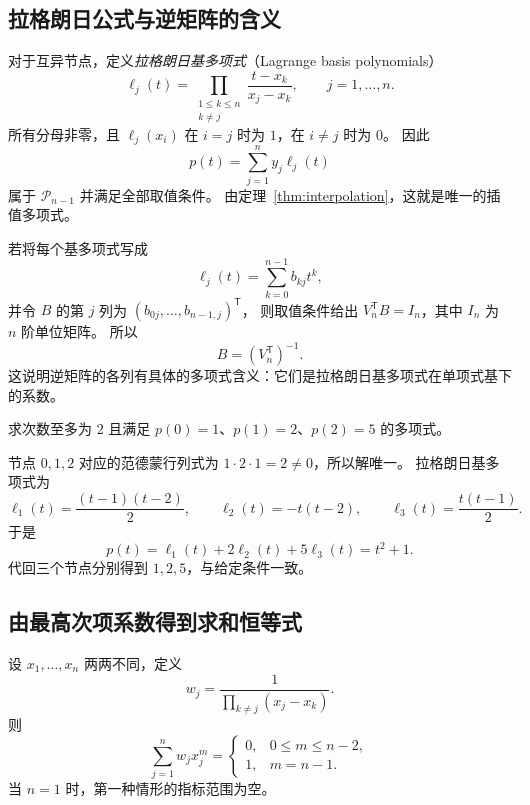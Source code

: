 \documentclass[UTF8,12pt,a4paper,fontset=fandol]{ctexart}
\begin{document}
\subsection{拉格朗日公式与逆矩阵的含义}

对于互异节点，定义\emph{拉格朗日基多项式}（Lagrange basis polynomials）
\begin{equation}
  \ell_j(t)=\prod_{\substack{1\leq k\leq n\\k\ne j}}
  \frac{t-x_k}{x_j-x_k},\qquad j=1,\ldots,n.
  \label{eq:lagrange-basis}
\end{equation}
所有分母非零，且 $\ell_j(x_i)$ 在 $i=j$ 时为 $1$，在 $i\ne j$ 时为 $0$。
因此
\begin{equation}
  p(t)=\sum_{j=1}^n y_j\ell_j(t)
  \label{eq:lagrange-interpolation}
\end{equation}
属于 $\mathcal P_{n-1}$ 并满足全部取值条件。
由定理~\ref{thm:interpolation}，这就是唯一的插值多项式。

若将每个基多项式写成
\[
  \ell_j(t)=\sum_{k=0}^{n-1}b_{kj}t^k,
\]
并令 $B$ 的第 $j$ 列为 $(b_{0j},\ldots,b_{n-1,j})^{\mathsf T}$，
则取值条件给出 $V_n^{\mathsf T}B=I_n$，其中 $I_n$ 为 $n$ 阶单位矩阵。
所以
\[
  B=(V_n^{\mathsf T})^{-1}.
\]
这说明逆矩阵的各列有具体的多项式含义：它们是拉格朗日基多项式在单项式基下的系数。

\begin{example}[由三个取值恢复二次多项式]
求次数至多为 $2$ 且满足 $p(0)=1$、$p(1)=2$、$p(2)=5$ 的多项式。
\end{example}

\begin{solve}
节点 $0,1,2$ 对应的范德蒙行列式为 $1\cdot2\cdot1=2\ne0$，所以解唯一。
拉格朗日基多项式为
\[
  \ell_1(t)=\frac{(t-1)(t-2)}2,\qquad
  \ell_2(t)=-t(t-2),\qquad
  \ell_3(t)=\frac{t(t-1)}2.
\]
于是
\[
  p(t)=\ell_1(t)+2\ell_2(t)+5\ell_3(t)=t^2+1.
\]
代回三个节点分别得到 $1,2,5$，与给定条件一致。
\end{solve}

\subsection{由最高次项系数得到求和恒等式}

\begin{proposition}[插值权重恒等式]
\label{prop:interpolation-weights}
设 $x_1,\ldots,x_n$ 两两不同，定义
\[
  w_j=\frac{1}{\prod_{k\ne j}(x_j-x_k)}.
\]
则
\begin{equation}
  \sum_{j=1}^n w_jx_j^m
  =\begin{cases}
    0,&0\leq m\leq n-2,\\
    1,&m=n-1.
  \end{cases}
  \label{eq:interpolation-weights}
\end{equation}
当 $n=1$ 时，第一种情形的指标范围为空。
\end{proposition}
\end{document}
